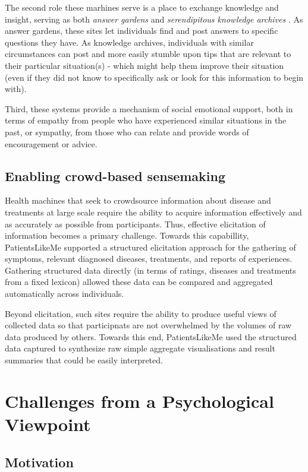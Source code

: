 \documentclass{sig-alternate}
\begin{document}
The second role these marhines serve is a place to exchange knowledge
and insight, serving as both \emph{answer gardens} \cite{answergarden}
and \emph{serendipitous knowledge archives} \cite{knowledgearchive}.
As answer gardens, these sites let individuals find and post answers
to specific questions they have.  As knowledge archives, individuals
with similar circumstances can post and more easily stumble upon tips
that are relevant to their particular situation(s) - which might help
them improve their situation (even if they did not know to
specifically ask or look for this information to begin with).

Third, these systems provide a mechanism of social emotional support,
both in terms of empathy from people who have experienced similar
situations in the past, or sympathy, from those who can relate and
provide words of encouragement or advice.

\subsection{Enabling crowd-based sensemaking}

Health machines that seek to crowdsource information about disease and
treatments at large scale require the ability to acquire information
effectively and as accurately as possible from participants.  Thus,
effective elicitation of information becomes a primary challenge.
Towards this capabillity, PatientsLikeMe supported a structured
elicitation approach for the gathering of symptoms, relevant diagnosed
diseases, treatments, and reports of experiences.  Gathering
structured data directly (in terms of ratings, diseases and treatments
from a fixed lexicon) allowed these data can be compared and
aggregated automatically across individuals.  

Beyond elicitation, such sites require the ability to produce useful
views of collected data so that participnats are not overwhelmed by
the volumes of raw data produced by others.  Towards this end,
PatientsLikeMe used the structured data captured to synthesize raw
simple aggregate visualisations and result summaries that could be
easily interpreted.

\section{Challenges from a Psychological Viewpoint}

\subsection{Motivation}
\end{document}
